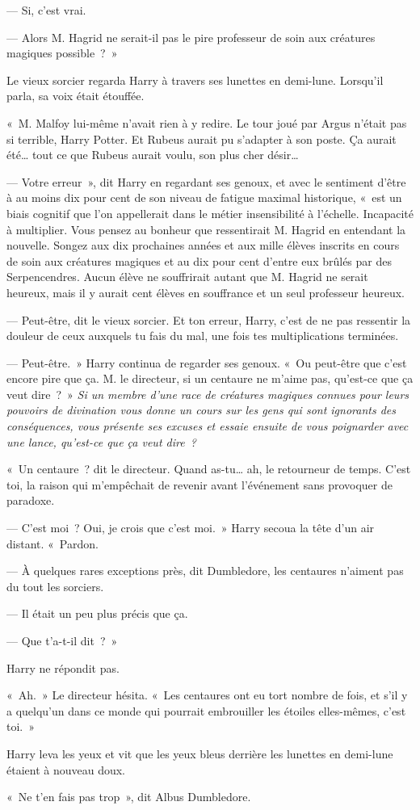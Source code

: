 --- Si, c'est vrai.

--- Alors M. Hagrid ne serait-il pas le pire professeur de soin aux créatures magiques possible~?~»

Le vieux sorcier regarda Harry à travers ses lunettes en demi-lune.
Lorsqu'il parla, sa voix était étouffée.

«~M. Malfoy lui-même n'avait rien à y redire.
Le tour joué par Argus n'était pas si terrible, Harry Potter.
Et Rubeus aurait pu s'adapter à son poste.
Ça aurait été… tout ce que Rubeus aurait voulu, son plus cher désir…

--- Votre erreur~», dit Harry en regardant ses genoux, et avec le sentiment d'être à au moins dix pour cent de son niveau de fatigue maximal historique, «~est un biais cognitif que l'on appellerait dans le métier insensibilité à l'échelle.
Incapacité à multiplier.
Vous pensez au bonheur que ressentirait M. Hagrid en entendant la nouvelle.
Songez aux dix prochaines années et aux mille élèves inscrits en cours de soin aux créatures magiques et au dix pour cent d'entre eux brûlés par des Serpencendres.
Aucun élève ne souffrirait autant que M. Hagrid ne serait heureux, mais il y aurait cent élèves en souffrance et un seul professeur heureux.

--- Peut-être, dit le vieux sorcier.
Et ton erreur, Harry, c'est de ne pas ressentir la douleur de ceux auxquels tu fais du mal, une fois tes multiplications terminées.

--- Peut-être.~»
Harry continua de regarder ses genoux.
«~Ou peut-être que c'est encore pire que ça.
M. le directeur, si un centaure ne m'aime pas, qu'est-ce que ça veut dire~?~»
\emph{Si un membre d'une race de créatures magiques connues pour leurs pouvoirs de divination vous donne un cours sur les gens qui sont ignorants des conséquences, vous présente ses excuses et essaie ensuite de vous poignarder avec une lance, qu'est-ce que ça veut dire~?}

«~Un centaure~? dit le directeur.
Quand as-tu… ah, le retourneur de temps.
C'est toi, la raison qui m'empêchait de revenir avant l'événement sans provoquer de paradoxe.

--- C'est moi~?
Oui, je crois que c'est moi.~»
Harry secoua la tête d'un air distant.
«~Pardon.

--- À quelques rares exceptions près, dit Dumbledore, les centaures n'aiment pas du tout les sorciers.

--- Il était un peu plus précis que ça.

--- Que t'a-t-il dit~?~»

Harry ne répondit pas.

«~Ah.~» Le directeur hésita.
«~Les centaures ont eu tort nombre de fois, et s'il y a quelqu'un dans ce monde qui pourrait embrouiller les étoiles elles-mêmes, c'est toi.~»

Harry leva les yeux et vit que les yeux bleus derrière les lunettes en demi-lune étaient à nouveau doux.

«~Ne t'en fais pas trop~», dit Albus Dumbledore. 
